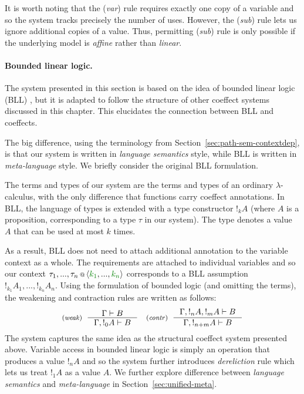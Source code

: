 It is worth noting that the (\emph{var}) rule requires exactly one copy of a variable and so 
the system tracks precisely the number of uses. However, the (\emph{sub}) rule lets us 
ignore additional copies of a value. Thus, permitting (\emph{sub}) rule is only possible if the
underlying model is \emph{affine} rather than \emph{linear}.

\paragraph{Bounded linear logic.}
The system presented in this section is based on the idea of bounded linear logic (BLL)
\cite{logic-bounded}, but it is adapted to follow the structure of other coeffect systems 
discussed in this chapter. This elucidates the connection between BLL and coeffects.

The big difference, using the terminology from Section~\ref{sec:path-sem-contextdep}, is 
that our system is written in \emph{language semantics} style, while BLL is written 
in \emph{meta-language} style. We briefly consider the original BLL formulation.

The terms and types of our system are the terms and types of an ordinary $\lambda$-calculus, 
with the only difference that functions carry coeffect annotations. In BLL, the language of 
types is extended with a type constructor $!_k A$ (where $A$ is a proposition, corresponding 
to a type $\tau$ in our system). The type denotes a value $A$ that can be used at most $k$ times. 

As a result, BLL does not need to attach additional annotation to the variable context 
as a whole. The requirements are attached to individual variables and so our context
$\coctx{\tau_1, ..., \tau_n}{\langle \cclrd{k_1}, ..., \cclrd{k_n}\rangle}$ corresponds
to a BLL assumption $!_{k_1} A_1, ..., !_{k_n} A_n$. Using the formulation of bounded logic 
(and omitting the terms), the weakening and contraction rules are written as follows:
%
\[
\tyrule{weak}
  {\Gamma \vdash B}
  {\Gamma, !_0 A \vdash B}
\quad
\tyrule{contr}
  {\Gamma, !_n A, !_m A \vdash B}
  {\Gamma, !_{n+m} A \vdash B}
\]
%
The system captures the same idea as the structural coeffect system presented above.
Variable access in bounded linear logic is simply an operation that produces a value
$!_n A$ and so the system further introduces \emph{dereliction} rule which lets us 
treat $!_1 A$ as a value $A$. We further explore difference between \emph{language
semantics} and \emph{meta-language} in Section~\ref{sec:unified-meta}.

